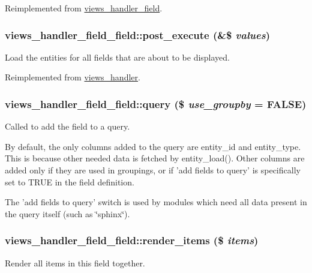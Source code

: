 Reimplemented from \hyperlink{classviews__handler__field_a0435d161922b7b4b84f02a2e79bb947a}{views\_\-handler\_\-field}.\hypertarget{classviews__handler__field__field_ad28ba30ac4cccf41187e702258883681}{
\subsubsection[{post\_\-execute}]{\setlength{\rightskip}{0pt plus 5cm}views\_\-handler\_\-field\_\-field::post\_\-execute (\&\$ {\em values})}}
\label{classviews__handler__field__field_ad28ba30ac4cccf41187e702258883681}
Load the entities for all fields that are about to be displayed. 

Reimplemented from \hyperlink{classviews__handler_a78896f02cc58523ccc369d242d92c6a1}{views\_\-handler}.\hypertarget{classviews__handler__field__field_a17122cc581a8411708059011a6db180d}{
\subsubsection[{query}]{\setlength{\rightskip}{0pt plus 5cm}views\_\-handler\_\-field\_\-field::query (\$ {\em use\_\-groupby} = {\ttfamily FALSE})}}
\label{classviews__handler__field__field_a17122cc581a8411708059011a6db180d}
Called to add the field to a query.

By default, the only columns added to the query are entity\_\-id and entity\_\-type. This is because other needed data is fetched by entity\_\-load(). Other columns are added only if they are used in groupings, or if 'add fields to query' is specifically set to TRUE in the field definition.

The 'add fields to query' switch is used by modules which need all data present in the query itself (such as \char`\"{}sphinx\char`\"{}). \hypertarget{classviews__handler__field__field_aa2206b6422041cc4e82c8091a5c28f15}{
\subsubsection[{render\_\-items}]{\setlength{\rightskip}{0pt plus 5cm}views\_\-handler\_\-field\_\-field::render\_\-items (\$ {\em items})}}
\label{classviews__handler__field__field_aa2206b6422041cc4e82c8091a5c28f15}
Render all items in this field together.

